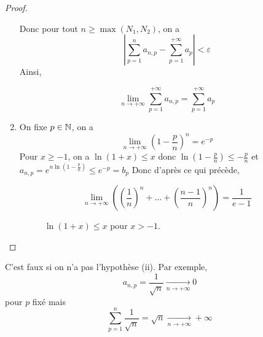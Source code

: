 \documentclass[12pt]{article}
\begin{document}
\begin{proof}
\begin{enumerate}
		Donc pour tout $n\geqslant\max\left(N_{1},N_{2}\right)$, on a 
		\begin{equation*}\left\lvert\sum_{p=1}^{n}a_{n,p}-\sum_{p=1}^{+\infty}a_{p}\right\rvert<\varepsilon\end{equation*}
		Ainsi,

		\begin{equation*}\boxed{\lim\limits_{n\to+\infty}\sum_{p=1}^{+\infty}a_{n,p}=\sum_{p=1}^{+\infty}a_{p}}\end{equation*}

		\item On fixe $p\in\mathbb{N}$, on a 
		\begin{equation*}\lim\limits_{n\to+\infty}\left(1-\frac{p}{n}\right)^{n}=e^{-p}\end{equation*}
		Pour $x\geqslant -1$, on a $\ln\left(1+x\right)\leqslant x$ donc $\ln\left(1-\frac{p}{n}\right)\leqslant -\frac{p}{n}$ et $a_{n,p}=e^{n\ln\left(1-\frac{p}{n}\right)}\leqslant e^{-p}=b_{p}$
		Donc d'après ce qui précède, 
		
		\begin{equation*}\lim\limits_{n\to+\infty}\left(\left(\frac{1}{n}\right)^{n}+\dots+\left(\frac{n-1}{n}\right)^{n}\right)=\frac{1}{e-1}\end{equation*}
		
		\begin{figure}[ht!]
			\centering
			\caption{$\ln\left(1+x\right)\leqslant x$ pour $x>-1$.}
		\end{figure}
	\end{enumerate}
\end{proof}

\begin{remark}
	C'est faux si on n'a pas l'hypothèse (ii). Par exemple, 
	\begin{equation*}a_{n,p}=\frac{1}{\sqrt{n}}\xrightarrow[n\to+\infty]{}0\end{equation*}
	pour $p$ fixé mais 
	\begin{equation*}\sum_{p=1}^{n}\frac{1}{\sqrt{n}}=\sqrt{n}\xrightarrow[n\to+\infty]{}+\infty\end{equation*}
\end{remark}
\end{document}
